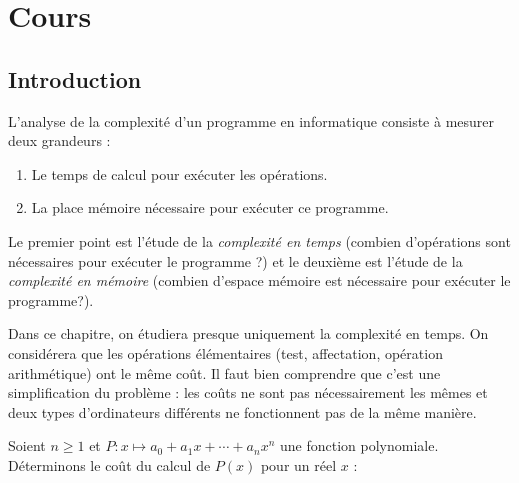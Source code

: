 \documentclass[french,11pt,twoside]{VcCours}
\begin{document}

\tableofcontents
\separationTitre


\section{Cours}

\subsection{Introduction}

L'analyse de la complexité d'un programme en informatique consiste 
à mesurer deux grandeurs :

\begin{enumerate}
\item Le temps de calcul pour exécuter les opérations.
\item La place mémoire nécessaire pour exécuter ce programme.
\end{enumerate}

\medskip 

Le premier point est l'étude de la \emph{complexité en temps} 
(combien d'opérations sont nécessaires pour exécuter le programme ?) 
et le deuxième est l'étude de la \emph{complexité en mémoire} 
(combien d'espace mémoire est nécessaire pour exécuter le programme?). 

\medskip

Dans ce chapitre, on étudiera presque uniquement la complexité en temps. 
On considérera que les opérations élémentaires (test, affectation, 
opération arithmétique) ont le même coût. Il faut bien comprendre que c'est 
une simplification du problème : les coûts ne sont pas nécessairement 
les mêmes et deux types d'ordinateurs différents ne fonctionnent pas 
de la même manière.

\medskip

\begin{Exercice}{} Soient $n \geq 1$ et $P : x \mapsto a_0 + a_1 x + \cdots + a_n x^n$ une fonction polynomiale. Déterminons le coût du calcul de $P(x)$ pour un réel $x$ :

\vspace{6cm}

%
\end{Exercice}
\end{document}
